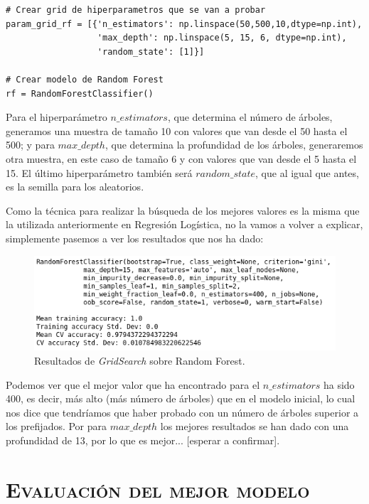 \documentclass[11pt,a4paper]{article}
\begin{document}
\begin{lstlisting}
# Crear grid de hiperparametros que se van a probar
param_grid_rf = [{'n_estimators': np.linspace(50,500,10,dtype=np.int),
                  'max_depth': np.linspace(5, 15, 6, dtype=np.int),
                  'random_state': [1]}]

# Crear modelo de Random Forest
rf = RandomForestClassifier()

\end{lstlisting}

Para el hiperparámetro $n\_estimators$, que determina el número de árboles, generamos una muestra de tamaño 10 con valores que van desde el 50 hasta el 500; y para $max\_depth$, que determina la profundidad de los árboles, generaremos otra muestra, en este caso de tamaño 6 y con valores que van desde el 5 hasta el 15. El último hiperparámetro también será $random\_state$, que al igual que antes, es la semilla para los aleatorios.

Como la técnica para realizar la búsqueda de los mejores valores es la misma que la utilizada anteriormente en Regresión Logística, no la vamos a volver a explicar, simplemente pasemos a ver los resultados que nos ha dado:

\begin{figure}[H]
    \centering
    \includegraphics[scale=0.6]{img/gs-rf.png}
    \caption{Resultados de \textit{GridSearch} sobre Random Forest.}
    \label{fig:gs-lr}
\end{figure}

Podemos ver que el mejor valor que ha encontrado para el $n\_estimators$ ha sido 400, es decir, más alto (más número de árboles) que en el modelo inicial, lo cual nos dice que tendríamos que haber probado con un número de árboles superior a  los prefijados. Por  para $max\_depth$ los mejores resultados se han dado con una profundidad de 13, por lo que es mejor... [esperar a confirmar].

\section{\textsc{Evaluación del mejor modelo}}
\end{document}
